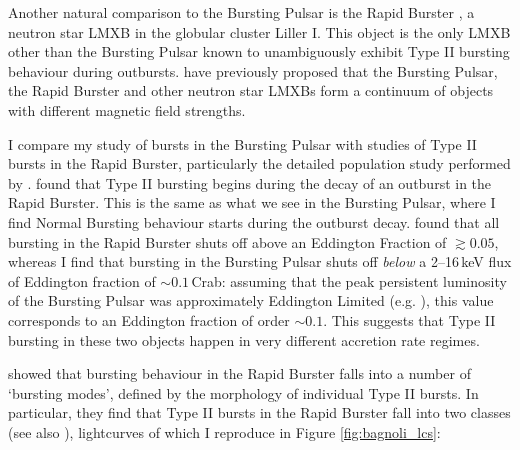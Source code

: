 \par Another natural comparison to the Bursting Pulsar is the Rapid Burster \citep{Lewin_RBDiscovery}, a neutron star LMXB in the globular cluster Liller I.  This object is the only LMXB other than the Bursting Pulsar known to unambiguously exhibit Type II bursting behaviour during outbursts.  \citet{Rappaport_BPHistory} have previously proposed that the Bursting Pulsar, the Rapid Burster and other neutron star LMXBs form a continuum of objects with different magnetic field strengths.
\par I compare my study of bursts in the Bursting Pulsar with studies of Type II bursts in the Rapid Burster, particularly the detailed population study performed by \citet{Bagnoli_PopStudy}.  \citet{Bagnoli_PopStudy} found that Type II bursting begins during the decay of an outburst in the Rapid Burster.  This is the same as what we see in the Bursting Pulsar, where I find Normal Bursting behaviour starts during the outburst decay.  \citet{Bagnoli_PopStudy} found that all bursting in the Rapid Burster shuts off above an Eddington Fraction of $\gtrsim0.05$, whereas I find that bursting in the Bursting Pulsar shuts off \textit{below} a 2--16\,keV flux of Eddington fraction of $\sim0.1$\,Crab: assuming that the peak persistent luminosity of the Bursting Pulsar was approximately Eddington Limited (e.g. \citealp{Sazonov_BPGranat}), this value corresponds to an Eddington fraction of order $\sim0.1$.  This suggests that Type II bursting in these two objects happen in very different accretion rate regimes.
\par \citet{Bagnoli_PopStudy} showed that bursting behaviour in the Rapid Burster falls into a number of `bursting modes', defined by the morphology of individual Type II bursts.  In particular, they find that Type II bursts in the Rapid Burster fall into two classes (see also \citealp{Marshall_2types}), lightcurves of which I reproduce in Figure \ref{fig:bagnoli_lcs}:

